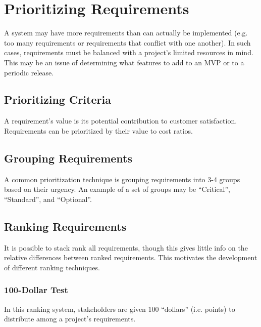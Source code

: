 \documentclass[12pt,titlepage]{article}
\begin{document}
  \newpage

  \section{Prioritizing Requirements}
    A system may have more requirements than can actually be implemented (e.g. too many requirements or requirements that conflict with one another).
    In such cases, requirements must be balanced with a project's limited resources in mind. This may be an issue of determining what features to add
    to an MVP or to a periodic release.

    \subsection{Prioritizing Criteria}
      A requirement's value is its potential contribution to customer satisfaction. Requirements can be prioritized by their value to cost ratios.

    \subsection{Grouping Requirements}
      A common prioritization technique is grouping requirements into 3-4 groups based on their urgency. An example of a set of groups may be
      ``Critical'', ``Standard'', and ``Optional''.

    \subsection{Ranking Requirements}
      It is possible to stack rank all requirements, though this gives little info on the relative differences between ranked requirements. This motivates
      the development of different ranking techniques.

      \subsubsection{100-Dollar Test}
        In this ranking system, stakeholders are given 100 ``dollars'' (i.e. points) to distribute among a project's requirements.
\end{document}
